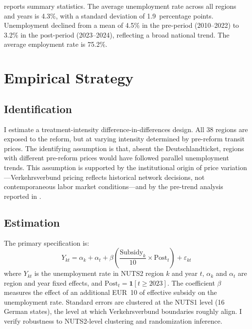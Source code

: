 \documentclass[12pt]{article}
\begin{document}
 reports summary statistics. The average unemployment rate across all regions and years is 4.3\%, with a standard deviation of 1.9~percentage points. Unemployment declined from a mean of 4.5\% in the pre-period (2010--2022) to 3.2\% in the post-period (2023--2024), reflecting a broad national trend. The average employment rate is 75.2\%.



\section{Empirical Strategy}
\label{sec:strategy}

\subsection{Identification}

I estimate a treatment-intensity difference-in-differences design. All 38 regions are exposed to the reform, but at varying intensity determined by pre-reform transit prices. The identifying assumption is that, absent the Deutschlandticket, regions with different pre-reform prices would have followed parallel unemployment trends. This assumption is supported by the institutional origin of price variation---Verkehrsverbund pricing reflects historical network decisions, not contemporaneous labor market conditions---and by the pre-trend analysis reported in .

\subsection{Estimation}

The primary specification is:
\begin{equation}
Y_{kt} = \alpha_k + \alpha_t + \beta \left(\frac{\text{Subsidy}_k}{10} \times \text{Post}_t\right) + \varepsilon_{kt}
\end{equation}
where $Y_{kt}$ is the unemployment rate in NUTS2 region $k$ and year $t$, $\alpha_k$ and $\alpha_t$ are region and year fixed effects, and $\text{Post}_t = \mathbf{1}[t \geq 2023]$. The coefficient $\beta$ measures the effect of an additional EUR~10 of effective subsidy on the unemployment rate. Standard errors are clustered at the NUTS1 level (16 German states), the level at which Verkehrsverbund boundaries roughly align. I verify robustness to NUTS2-level clustering and randomization inference.
\end{document}
